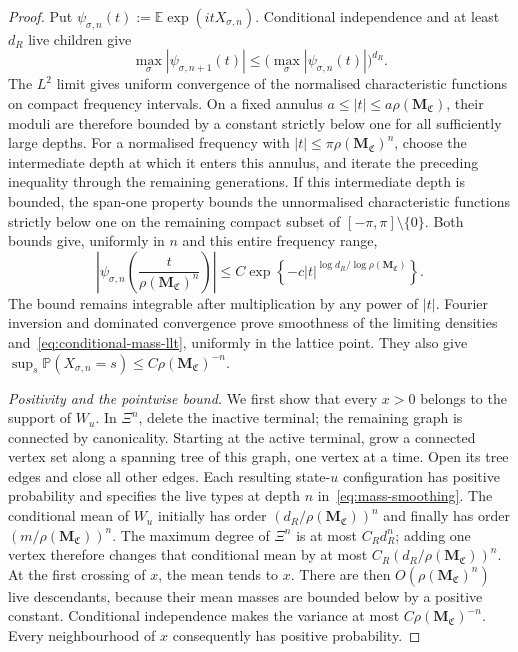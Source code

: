 \begin{proof}
Put $\psi_{\sigma,n}(t):=\mathbb E\exp(itX_{\sigma,n})$.
Conditional independence and at least $d_R$ live children give
\[
 \max_\sigma|\psi_{\sigma,n+1}(t)|
 \le\bigl(\max_\sigma|\psi_{\sigma,n}(t)|\bigr)^{d_R}.
\]
The $L^2$ limit gives uniform convergence of the normalised characteristic functions on compact frequency intervals.
On a fixed annulus $a\le |t|\le a\rho(\mathbf M_{\mathfrak C})$, their moduli are therefore bounded by a constant strictly below one for all sufficiently large depths.
For a normalised frequency with $|t|\le\pi\rho(\mathbf M_{\mathfrak C})^n$, choose the intermediate depth at which it enters this annulus, and iterate the preceding inequality through the remaining generations.
If this intermediate depth is bounded, the span-one property bounds the unnormalised characteristic functions strictly below one on the remaining compact subset of $[-\pi,\pi]\setminus\{0\}$.
Both bounds give, uniformly in $n$ and this entire frequency range,
\[
 \left|\psi_{\sigma,n}\!\left(\frac{t}{\rho(\mathbf M_{\mathfrak C})^n}\right)\right|
 \le C\exp\left\{-c|t|^{\log d_R/\log\rho(\mathbf M_{\mathfrak C})}\right\}.
\]
The bound remains integrable after multiplication by any power of $|t|$.
Fourier inversion and dominated convergence prove smoothness of the limiting densities and~\eqref{eq:conditional-mass-llt}, uniformly in the lattice point.
They also give $\sup_s\mathbb P(X_{\sigma,n}=s)\le C\rho(\mathbf M_{\mathfrak C})^{-n}$.

\emph{Positivity and the pointwise bound.}
We first show that every $x>0$ belongs to the support of $W_u$.
In $\Xi^n$, delete the inactive terminal; the remaining graph is connected by canonicality.
Starting at the active terminal, grow a connected vertex set along a spanning tree of this graph, one vertex at a time.
Open its tree edges and close all other edges.
Each resulting state-$u$ configuration has positive probability and specifies the live types at depth $n$ in~\eqref{eq:mass-smoothing}.
The conditional mean of $W_u$ initially has order $(d_R/\rho(\mathbf M_{\mathfrak C}))^n$ and finally has order $(m/\rho(\mathbf M_{\mathfrak C}))^n$.
The maximum degree of $\Xi^n$ is at most $C_Rd_R^n$; adding one vertex therefore changes that conditional mean by at most $C_R(d_R/\rho(\mathbf M_{\mathfrak C}))^n$.
At the first crossing of $x$, the mean tends to $x$.
There are then $O(\rho(\mathbf M_{\mathfrak C})^n)$ live descendants, because their mean masses are bounded below by a positive constant.
Conditional independence makes the variance at most $C\rho(\mathbf M_{\mathfrak C})^{-n}$.
Every neighbourhood of $x$ consequently has positive probability.


\end{proof}
